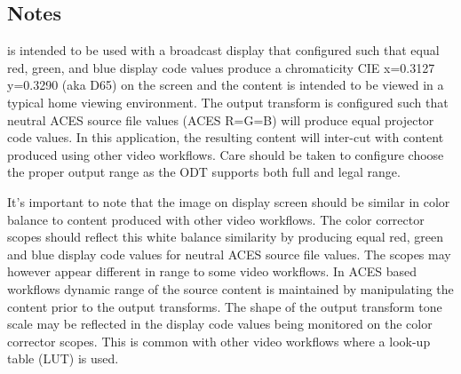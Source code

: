 \subsection{Notes}
\label{subsec:notes-rec709}

\texttt{} is intended to be used with a broadcast display that configured such that equal red, green, and blue display code values produce a chromaticity CIE x=0.3127 y=0.3290 (aka D65) on the screen and the content is intended to be viewed in a typical home viewing environment. The output transform is configured such that neutral ACES source file values (ACES R=G=B) will produce equal
projector code values. In this application, the resulting content will inter-cut with content produced using other video workflows.  Care should be taken to configure choose the proper output range as the ODT supports both full and legal range.

It's important to note that the image on display screen should be similar in color balance to content produced with other video workflows. The color corrector scopes should reflect this white balance similarity by producing equal red, green and blue display code values for neutral ACES source file values. The scopes may however appear different in range to some video workflows.  In ACES based workflows dynamic range of the source content is maintained by manipulating the content prior to the output transforms.  The shape of the output transform tone scale may be reflected in the display code values being monitored on the color corrector scopes.  This is common with other video workflows where a look-up table (LUT) is used.

